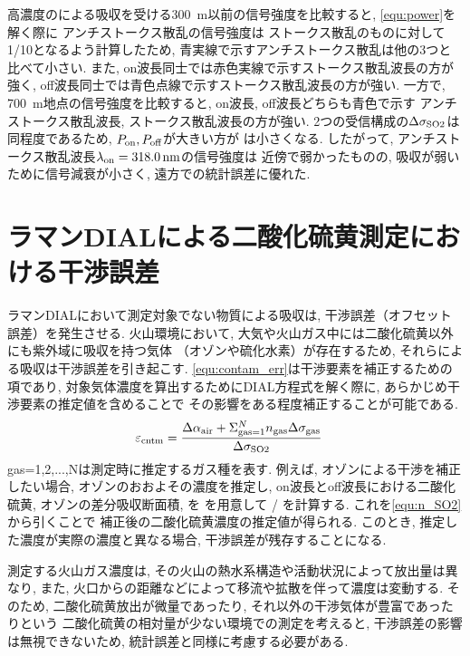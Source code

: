 \newpage
高濃度のによる吸収を受ける\qty{300}{m}以前の信号強度を比較すると, 
\cref{equ:power}を解く際に
アンチストークス散乱の信号強度は
ストークス散乱のものに対して1/10となるよう計算したため, 
青実線で示すアンチストークス散乱は他の3つと比べて小さい.
また, on波長同士では赤色実線で示すストークス散乱波長の方が強く, 
off波長同士では青色点線で示すストークス散乱波長の方が強い. 
一方で, \qty{700}{m}地点の信号強度を比較すると, 
on波長, off波長どちらも青色で示す
アンチストークス散乱波長, 
ストークス散乱波長の方が強い. 
2つの受信構成の$\Delta \sigma_{\mathrm{SO2}}$は同程度であるため, 
$P_{\mathrm{on}}, P_{\mathrm{off}}$が大きい方が
\staterr は小さくなる. 
したがって, 
アンチストークス散乱波長$\lambda_{\mathrm{on}}=\qty{318.0}{nm}$の信号強度は
近傍で弱かったものの, 
吸収が弱いために信号減衰が小さく, 
遠方での統計誤差に優れた. 

\newpage
\section{ラマンDIALによる二酸化硫黄測定における干渉誤差}
ラマンDIALにおいて測定対象でない物質による吸収は, 
干渉誤差（オフセット誤差）を発生させる. 
火山環境において, 大気や火山ガス中には二酸化硫黄以外にも紫外域に吸収を持つ気体
（オゾンや硫化水素）が存在するため,
それらによる吸収は干渉誤差を引き起こす. 
\cref{equ:contam_err}は干渉要素を補正するための項であり, 
対象気体濃度を算出するためにDIAL方程式を解く際に,
あらかじめ干渉要素の推定値を含めることで 
その影響をある程度補正することが可能である. 
\begin{align}
    \cntmerr
    &= \frac{\Delta \subrm{\alpha}{air}
    +\Sigma^N_{\mathrm{gas}=1}\subrm{n}{gas}\Delta\subrm{\sigma}{gas}}{\Delta \subrm{\sigma}{SO2}}\label{equ:contam_err}
\end{align}
gas=1,2,...,Nは測定時に推定するガス種を表す. 
例えば, オゾンによる干渉を補正したい場合, 
オゾンのおおよその濃度を推定し, 
on波長とoff波長における二酸化硫黄, オゾンの差分吸収断面積, を
を用意して
\times\Delta{}/\Delta{}
を計算する. これを\cref{equ:n_SO2}から引くことで
補正後の二酸化硫黄濃度の推定値が得られる.
このとき, 推定した濃度が実際の濃度と異なる場合,
干渉誤差が残存することになる.

測定する火山ガス濃度は, 
その火山の熱水系構造や活動状況によって放出量は異なり, 
また, 火口からの距離などによって移流や拡散を伴って濃度は変動する.
そのため, 二酸化硫黄放出が微量であったり, 
それ以外の干渉気体が豊富であったりという
二酸化硫黄の相対量が少ない環境での測定を考えると, 
干渉誤差の影響は無視できないため, 
統計誤差と同様に考慮する必要がある.

